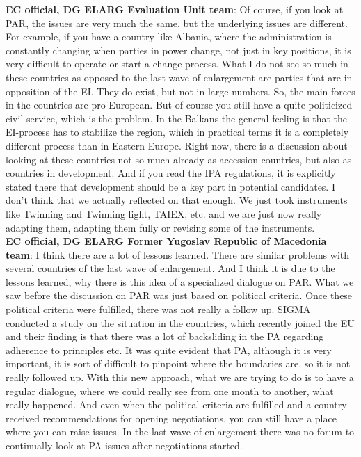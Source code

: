 \textbf{EC official, DG ELARG Evaluation Unit team}: Of course, if you look at PAR, the issues are very much the same, but the underlying issues are different. For example, if you have a country like Albania, where the administration is constantly changing when parties in power change, not just in key positions, it is very difficult to operate or start a change process. What I do not see so much in these countries as opposed to the last wave of enlargement are parties that are in opposition of the EI. They do exist, but not in large numbers. So, the main forces in the countries are pro-European. But of course you still have a quite politicized civil service, which is the problem. In the Balkans the general feeling is that the EI-process has to stabilize the region, which in practical terms it is a completely different process than in Eastern Europe. Right now, there is a discussion about looking at these countries not so much already as accession countries, but also as countries in development. And if you read the IPA regulations, it is explicitly stated there that development should be a key part in potential candidates. I don't think that we actually reflected on that enough. We just took instruments like Twinning and Twinning light, TAIEX, etc. and we are just now really adapting them, adapting them fully or revising some of the instruments.\\
\textbf{EC official, DG ELARG Former Yugoslav Republic of Macedonia team}: I think there are a lot of lessons learned. There are similar problems with several countries of the last wave of enlargement. And I think it is due to the lessons learned, why there is this idea of a specialized dialogue on PAR. What we saw before the discussion on PAR was just based on political criteria. Once these political criteria were fulfilled, there was not really a follow up. SIGMA conducted a study on the situation in the countries, which recently joined the EU and their finding is that there was a lot of backsliding in the PA regarding adherence to principles etc. It was quite evident that PA, although it is very important, it is sort of difficult to pinpoint where the boundaries are, so it is not really followed up. With this new approach, what we are trying to do is to have a regular dialogue, where we could really see from one month to another, what really happened. And even when the political criteria are fulfilled and a country received recommendations for opening negotiations, you can still have a place where you can raise issues. In the last wave of enlargement there was no forum to continually look at PA issues after negotiations started. \\
